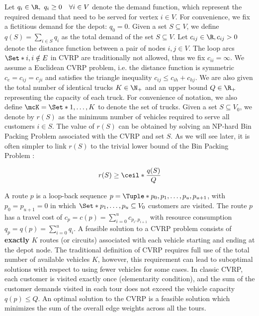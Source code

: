 Let $q_{i} \in \R,\ q_{i} \ge 0 \quad \forall i \in V$ denote the demand function, which represent the required demand that need to be served for vertex $i \in V$.
For convenience, we fix a fictitious demand for the depot: $q_0 = 0$.
Given a set $S \subseteq V$, we define $q(S) = \sum_{i \in S} q_i$ as the total demand of the set $S \subseteq V$.
Let $c_{ij} \in \R, c_{ij} > 0$ denote the distance function between a pair of nodes  $i, j \in V$.
The loop arcs $\Set*{i, i} \notin E$ in CVRP are traditionally not allowed, thus we fix $c_{ii} = \infty$.
We assume a Euclidean CVRP problem, i.e. the distance function is symmetric $c_e = c_{ij} = c_{ji}$ and satisfies the triangle inequality $c_{ij} \le c_{ih} + c_{hj}$.
We are also given the total number of identical trucks $K \in \N_+$ and an upper bound $Q \in \R_+$ representing the capacity of each truck.
For convenience of notation, we also define $\mcK = \Set*{1, \dots, K}$ to denote the set of trucks.
Given a set $S \subseteq V_0$, we denote by $r(S)$ as the minimum number of vehicles required to serve all customers $i \in S$.
The value of $r(S)$ can be obtained by solving an NP-hard Bin Packing Problem associated with the CVRP and set $S$.
As we will see later, it is often simpler to link $r(S)$ to the trivial lower bound of the Bin Packing Problem \parencite{martello1990}:

\begin{equation}
	r(S) \ge \ceil*{\frac{q(S)}{Q}}
\end{equation}

A route $p$ is a loop-back sequence $p = \Tuple*{p_0, p_1, \dots, p_u, p_{u + 1}}$,
with $p_0 = p_{u + 1} = 0$
in which $\Set*{p_1, \dots, p_u} \subseteq V_0$ customers are visited.
The route $p$ has a travel cost of $c_p = c(p) = \sum_{i=0}^{u} c_{p_i,p_{i+1}}$
with resource consumption $q_p = q(p) = \sum_{i=0}^{u} q_{i}$.
A feasible solution to a CVRP problem consists of \textbf{exactly} $K$ routes (or circuits)
associated with each vehicle starting and ending at the depot node.
The traditional definition of CVRP requires full use of the total number of available vehicles $K$,
however,
this requirement can lead to suboptimal solutions with respect to using fewer vehicles for some cases.
In classic CVRP, each customer is visited exactly once (elementarity condition),
and the sum of the customer demands visited in each tour does not exceed the vehicle capacity $q(p) \le Q$.
An optimal solution to the CVRP is a feasible solution which minimizes the sum of the overall edge weights across all the tours.

